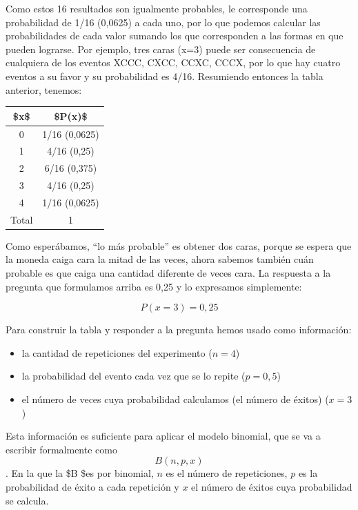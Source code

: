 \documentclass[]{book}
\begin{document}
Como estos 16 resultados son igualmente probables, le corresponde una
probabilidad de 1/16 (0,0625) a cada uno, por lo que podemos calcular
las probabilidades de cada valor sumando los que corresponden a las
formas en que pueden lograrse. Por ejemplo, tres caras (x=3) puede ser
consecuencia de cualquiera de los eventos XCCC, CXCC, CCXC, CCCX, por lo
que hay cuatro eventos a su favor y su probabilidad es 4/16. Resumiendo
entonces la tabla anterior, tenemos:

\begin{table}[H]
\centering
\begin{tabular}{cc}
\toprule
\$x\$ & \$P(x)\$\\
\midrule
\rowcolor{gray!6}  0 & 1/16 (0,0625)\\
1 & 4/16 (0,25)\\
\rowcolor{gray!6}  2 & 6/16 (0,375)\\
3 & 4/16 (0,25)\\
\rowcolor{gray!6}  4 & 1/16 (0,0625)\\
\addlinespace
Total & 1\\
\bottomrule
\end{tabular}
\end{table}

Como esperábamos, ``lo más probable'' es obtener dos caras, porque se
espera que la moneda caiga cara la mitad de las veces, ahora sabemos
también cuán probable es que caiga una cantidad diferente de veces cara.
La respuesta a la pregunta que formulamos arriba es 0,25 y lo expresamos
simplemente:

\[P(x = 3) = 0,25\]

Para construir la tabla y responder a la pregunta hemos usado como
información:

\begin{itemize}
\item
  la cantidad de repeticiones del experimento (\(n=4\))
\item
  la probabilidad del evento cada vez que se lo repite (\(p=0,5\))
\item
  el número de veces cuya probabilidad calculamos (el número de éxitos) (\(x=3\))
\end{itemize}

Esta información es suficiente para aplicar el modelo binomial, que se va a escribir formalmente como \[B(n, p, x)\]. En la que la \$B \$es por binomial, \(n\) es el número de repeticiones, \(p\) es la probabilidad de éxito a cada repetición y \(x\) el número de éxitos cuya probabilidad se calcula.
\end{document}
